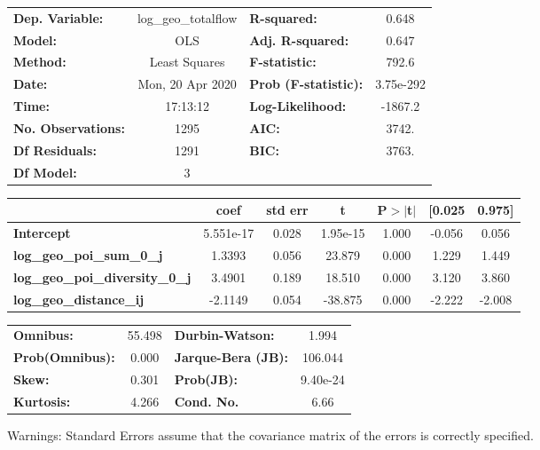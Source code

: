\begin{center}
\begin{tabular}{lclc}
\toprule
\textbf{Dep. Variable:}                 & log\_geo\_totalflow & \textbf{  R-squared:         } &     0.648   \\
\textbf{Model:}                         &         OLS         & \textbf{  Adj. R-squared:    } &     0.647   \\
\textbf{Method:}                        &    Least Squares    & \textbf{  F-statistic:       } &     792.6   \\
\textbf{Date:}                          &   Mon, 20 Apr 2020  & \textbf{  Prob (F-statistic):} & 3.75e-292   \\
\textbf{Time:}                          &       17:13:12      & \textbf{  Log-Likelihood:    } &   -1867.2   \\
\textbf{No. Observations:}              &          1295       & \textbf{  AIC:               } &     3742.   \\
\textbf{Df Residuals:}                  &          1291       & \textbf{  BIC:               } &     3763.   \\
\textbf{Df Model:}                      &             3       & \textbf{                     } &             \\
\bottomrule
\end{tabular}
\begin{tabular}{lcccccc}
                                        & \textbf{coef} & \textbf{std err} & \textbf{t} & \textbf{P$> |$t$|$} & \textbf{[0.025} & \textbf{0.975]}  \\
\midrule
\textbf{Intercept}                      &    5.551e-17  &        0.028     &  1.95e-15  &         1.000        &       -0.056    &        0.056     \\
\textbf{log\_geo\_poi\_sum\_0\_j}       &       1.3393  &        0.056     &    23.879  &         0.000        &        1.229    &        1.449     \\
\textbf{log\_geo\_poi\_diversity\_0\_j} &       3.4901  &        0.189     &    18.510  &         0.000        &        3.120    &        3.860     \\
\textbf{log\_geo\_distance\_ij}         &      -2.1149  &        0.054     &   -38.875  &         0.000        &       -2.222    &       -2.008     \\
\bottomrule
\end{tabular}
\begin{tabular}{lclc}
\textbf{Omnibus:}       & 55.498 & \textbf{  Durbin-Watson:     } &    1.994  \\
\textbf{Prob(Omnibus):} &  0.000 & \textbf{  Jarque-Bera (JB):  } &  106.044  \\
\textbf{Skew:}          &  0.301 & \textbf{  Prob(JB):          } & 9.40e-24  \\
\textbf{Kurtosis:}      &  4.266 & \textbf{  Cond. No.          } &     6.66  \\
\bottomrule
\end{tabular}
\end{center}

Warnings: \newline
 [1] Standard Errors assume that the covariance matrix of the errors is correctly specified.